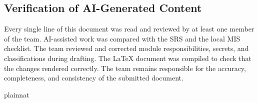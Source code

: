 \documentclass[12pt, titlepage]{article}
\begin{document}
\subsection{Verification of AI-Generated Content}

Every single line of this document was read and reviewed by at least one member of the team.
AI-assisted work was compared with the SRS and the local MIS
checklist. The team reviewed and corrected module responsibilities, secrets,
and classifications during drafting. The \LaTeX{} document was compiled to
check that the changes rendered correctly. The team remains responsible for the
accuracy, completeness, and consistency of the submitted document.

\newpage{}

 {plainnat}

\end{document}
